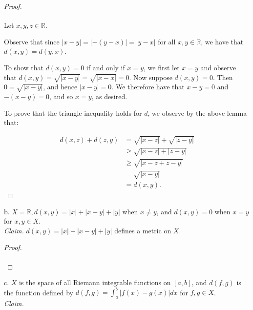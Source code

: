     \begin{proof}\ \\\\
        Let $x, y, z \in \mathbb{R}$.
       
        Observe that since $|x - y| =  |-(y - x)| = |y - x|$ for all $x, y \in \mathbb{R}$, we have that $d(x, y) = d(y, x)$.

        To show that $d(x, y) = 0$ if and only if $x = y$, we first let $x = y$ and observe that $d(x, y) = \sqrt{|x - y|} = \sqrt{|x - x|} = 0$.
        Now suppose $d(x, y) = 0$. Then $0 = \sqrt{|x - y|}$, and hence $|x - y| = 0$. We therefore have that $x - y = 0$ and $-(x - y) = 0$, and so
        $x = y$, as desired. 

        To prove that the triangle inequality holds for $d$, we observe by the above lemma that:
        
        \begin{align*}
            d(x, z) + d(z, y) &= \sqrt{|x - z|} + \sqrt{|z - y|} \\
                              &\ge \sqrt{|x - z| + |z - y|} \\
                              &\ge \sqrt{|x - z + z - y|} \\
                              &= \sqrt{|x - y|} \\
                              &= d(x, y).
        \end{align*}
    \end{proof}

    \pagebreak

b.  $X = \mathbb{R}, d(x, y) = |x| + |x - y| + |y|$ when $x \neq y$, and 
    $d(x, y) = 0$ when $x = y$ for $x, y \in X$. \ \\

    \emph{Claim.} $d(x, y) = |x| + |x - y| + |y|$ defines a metric on $X$.
    \ \\

    \begin{proof}\renewcommand{\qedsymbol}{}\ \\\\
    \end{proof}

    \pagebreak

c.  $X$ is the space of all Riemann integrable functions on $[a, b]$, and 
    $d(f, g)$ is the function defined by 
    $d(f, g) = \int_a^b{|f(x) - g(x)|dx}$ for $f, g \in X$. \ \\

    \emph{Claim.} 
    \ \\

